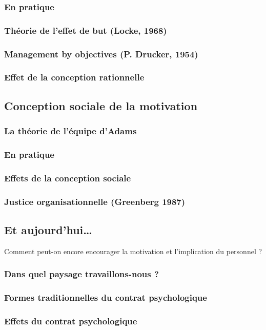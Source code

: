 \documentclass[12pt]{article}
\begin{document}
		\subsubsection{En pratique}
		\subsubsection{Théorie de l’effet de but (Locke, 1968)}
		\subsubsection{Management by objectives (P. Drucker, 1954)}
		\subsubsection{Effet de la conception rationnelle}
	\subsection{Conception sociale de la motivation}
		\subsubsection{La théorie de l’équipe d’Adams}
		\subsubsection{En pratique}
		\subsubsection{Effets de la conception sociale}
		\subsubsection{Justice organisationnelle (Greenberg 1987)}
	\subsection{Et aujourd’hui…}
		Comment peut-on encore encourager la motivation et l’implication du personnel ?
		\subsubsection{Dans quel paysage travaillons-nous ?}
		\subsubsection{Formes traditionnelles du contrat psychologique}
		\subsubsection{Effets du contrat psychologique}
\end{document}
